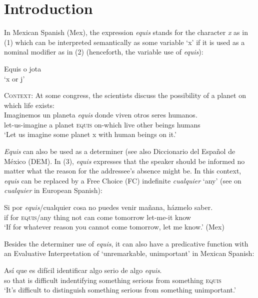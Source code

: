\documentclass[output=paper
,modfonts
,nonflat]{langsci/langscibook}
\author{Olga Kellert\affiliation{Georg-August-Universität Göttingen}}
\begin{document}
\maketitle
\section{Introduction}\label{sec:kellert:1}
In Mexican Spanish (Mex), the expression \textit{equis} stands for the character \textit{x} as in (1) which can be interpreted semantically as some variable ‘x’ if it is used as a nominal modifier as in (2) (henceforth, the variable use of \textit{equis}):

\ea
Equis o jota\\
`x or j'
\z

\ea
\textsc{Context}: At some congress, the scientists discuss the possibility of a planet on which life exists:\\
\gll Imaginemos un planeta \textit{equis} donde viven otros seres humanos.\\
let-us-imagine a planet \textsc{equis} on-which live other beings humans\\
\glt `Let us imagine some planet x with human beings on it.'
\z

\textit{Equis} can also be used as a determiner (see also Diccionario del Español de México (\nocite{DEM}DEM). In (3), \textit{equis} expresses that the speaker should be informed no matter what the reason for the addressee’s absence might be. In this context, \textit{equis} can be replaced by a Free Choice (FC) indefinite \textit{cualquier} ‘any’ (see \citealt{AM2011} on \textit{cualquier} in European Spanish):

\ea
\gll Si por \textit{equis}/cualquier cosa no puedes venir mañana, házmelo saber.\\
if for \textsc{equis}/any thing not can come tomorrow let-me-it know\\
\glt ‘If for whatever reason you cannot come tomorrow, let me know.’ (Mex)
\z

Besides the determiner use of \textit{equis}, it can also have a predicative function with an Evaluative Interpretation of ‘unremarkable, unimportant’ in Mexican Spanish:

\ea
\gll Así que es difícil identificar algo serio de algo \textit{equis}.\\
so that is difficult indentifying something serious from something \textsc{equis}\\
\glt ‘It’s difficult to distinguish something serious from something unimportant.’
\z
\end{document}
